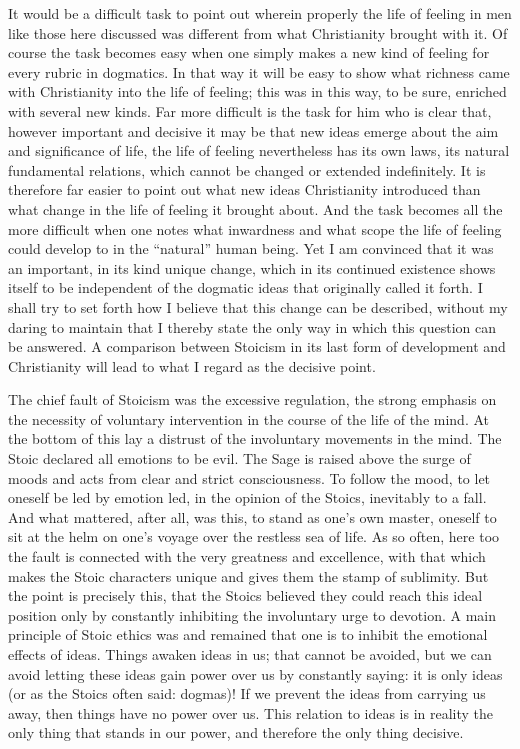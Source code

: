 \documentclass[12pt,a4paper,openany]{book}
\newcommand{\opage}[1]{\marginnote{\footnotesize\textit{[#1]}}}
\begin{document}
It would be a difficult task to point out wherein
properly the life of feeling in men like those here discussed was
different from what Christianity brought with it. Of course
the task becomes easy when one simply makes a new kind of feeling
for every rubric in dogmatics. In that way it will
be easy to show what richness came with Christianity
into the life of feeling; this was in this way, to be sure,
enriched with several new kinds. Far more difficult
is the task for him who is clear that, however important and
\opage{175}decisive it may be that new ideas emerge
about the aim and significance of life, the life of feeling nevertheless has
its own laws, its natural fundamental relations, which cannot
be changed or extended indefinitely. It is therefore far
easier to point out what new ideas Christianity
introduced than what change in the life of feeling it brought about.
And the task becomes all the more difficult when one
notes what inwardness and what scope
the life of feeling could develop to in the ``natural''
human being. Yet I am convinced that it was an important, in its
kind unique change, which in its continued existence shows itself to
be independent of the dogmatic ideas that originally
called it forth. I shall try to set forth how
I believe that this change can be described, without my daring
to maintain that I thereby state the only way in which
this question can be answered. A comparison between
Stoicism in its last form of development and Christianity
will lead to what I regard as the decisive point.

The chief fault of Stoicism was the excessive regulation, the
strong emphasis on the necessity of voluntary intervention
in the course of the life of the mind. At the bottom of this lay a distrust of
the involuntary movements in the mind. The Stoic declared
all emotions to be evil. The Sage is raised above the
surge of moods and acts from clear and strict
consciousness. To follow the mood, to let oneself be led by
emotion led, in the opinion of the Stoics, inevitably to
a fall. And what mattered, after all, was this, to stand as
one's own master, oneself to sit at the helm on one's voyage over the restless
sea of life. As so often, here too the fault is connected
with the very greatness and excellence, with that which makes the
Stoic characters unique and gives them the stamp of sublimity.
But the point is precisely this, that the Stoics believed they could
reach this ideal position only by constantly inhibiting the
involuntary urge to devotion. A main principle of Stoic
ethics was and remained that one is to inhibit
the emotional effects of ideas. Things awaken ideas
in us; that cannot be avoided, but we can avoid letting
these ideas gain power over us by constantly saying: it
\opage{176}is only ideas (or as the Stoics often said: dogmas)!
If we prevent the ideas from carrying us away, then things have
no power over us. This relation to ideas is in
reality the only thing that stands in our power, and therefore
the only thing decisive.
\end{document}
